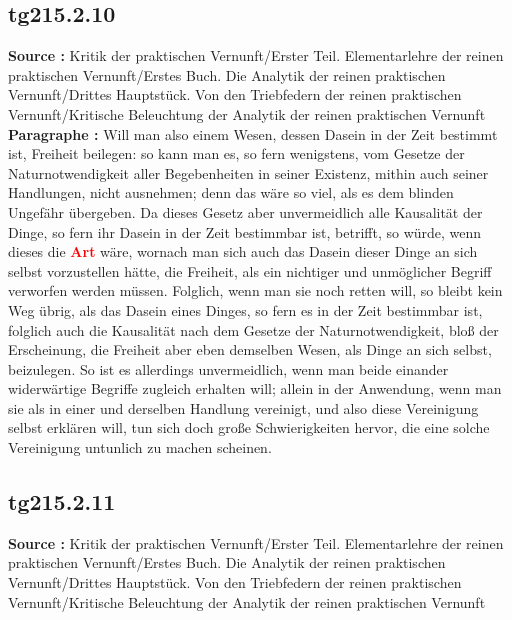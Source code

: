 \documentclass[a4paper,12pt,twoside]{book}
\newcommand{\match}[1]{\textcolor{red}{\textbf{#1}}}
\begin{document}
	\subsection*{tg215.2.10} 
	\textbf{Source : }Kritik der praktischen Vernunft/Erster Teil. Elementarlehre der reinen praktischen Vernunft/Erstes Buch. Die Analytik der reinen praktischen Vernunft/Drittes Hauptstück. Von den Triebfedern der reinen praktischen Vernunft/Kritische Beleuchtung der Analytik der reinen praktischen Vernunft\\  
	
	\noindent\textbf{Paragraphe : }Will man also einem Wesen, dessen Dasein in der Zeit bestimmt ist, Freiheit beilegen: so kann man es, so fern wenigstens, vom Gesetze der Naturnotwendigkeit aller Begebenheiten in seiner Existenz, mithin auch seiner Handlungen, nicht ausnehmen; denn das wäre so viel, als es dem blinden Ungefähr übergeben. Da dieses Gesetz aber unvermeidlich alle Kausalität der Dinge, so fern ihr Dasein in der Zeit bestimmbar ist, betrifft, so würde, wenn dieses die \match{Art} wäre, wornach man sich auch das Dasein dieser Dinge an sich selbst vorzustellen hätte, die Freiheit, als ein nichtiger und unmöglicher Begriff verworfen werden müssen. Folglich, wenn man sie noch retten will, so bleibt kein Weg übrig, als das Dasein eines Dinges, so fern es in der Zeit bestimmbar ist, folglich auch die Kausalität nach dem Gesetze der Naturnotwendigkeit, bloß der Erscheinung, die Freiheit aber eben demselben Wesen, als Dinge an sich selbst, beizulegen. So ist es allerdings unvermeidlich, wenn man beide einander widerwärtige Begriffe zugleich erhalten will; allein in der Anwendung, wenn man sie als in einer und derselben Handlung vereinigt, und also diese Vereinigung selbst erklären will, tun sich doch große Schwierigkeiten hervor, die eine solche Vereinigung untunlich zu machen scheinen. 
	
	\subsection*{tg215.2.11} 
	\textbf{Source : }Kritik der praktischen Vernunft/Erster Teil. Elementarlehre der reinen praktischen Vernunft/Erstes Buch. Die Analytik der reinen praktischen Vernunft/Drittes Hauptstück. Von den Triebfedern der reinen praktischen Vernunft/Kritische Beleuchtung der Analytik der reinen praktischen Vernunft\\  
	
\end{document}
